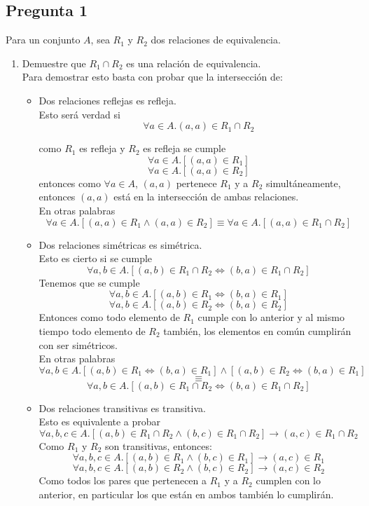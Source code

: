 \documentclass[letter]{article}
\begin{document}
	
	\begin{pregunta}{1} %
		\section*{Pregunta 1}
		Para un conjunto $A$, sea $R_1$ y $R_2$ dos relaciones de equivalencia.
		\begin{enumerate}
		\item Demuestre que $R_1 \cap R_2$ es una relación de equivalencia.\\
		
		Para demostrar esto basta con probar que la intersección de:
		\begin{itemize}
		\item Dos relaciones reflejas es refleja.\\
		
		Esto será verdad si 
		$$\forall a\in A. (a,a) \in R_1 \cap R_2$$
		
		como $R_1$ es refleja y $R_2$ es refleja se cumple 
		$$\forall a\in A. [(a,a) \in R_1]$$
		$$\forall a\in A. [(a,a) \in R_2]$$
		entonces como $\forall a\in A$, $(a,a)$ pertenece	$R_1$ y a $R_2$ simultáneamente, entonces $(a,a)$ está en la intersección de ambas relaciones.\\
		En otras palabras 
		$$\forall a \in A. [(a,a)\in R_1 \wedge (a,a)\in R_2]\equiv \forall a\in A.[(a,a)\in R_1\cap R_2]$$
		\item Dos relaciones simétricas es simétrica.\\
		
		Esto es cierto si se cumple
		$$\forall a,b  \in A. [(a,b)\in R_1\cap R_2 \Leftrightarrow (b,a)\in R_1\cap R_2] $$
		Tenemos que se cumple 
		$$\forall a,b  \in A. [(a,b)\in R_1 \Leftrightarrow (b,a)\in R_1] $$
		$$\forall a,b  \in A. [(a,b)\in R_2 \Leftrightarrow (b,a)\in R_2] $$
		Entonces como todo elemento de $R_1$ cumple con lo anterior y al mismo tiempo todo elemento de $R_2$ también, los elementos en común cumplirán con ser simétricos.\\
		En otras palabras
		$$\forall a,b  \in A. [(a,b)\in R_1 \Leftrightarrow (b,a)\in R_1]\wedge [(a,b)\in R_2 \Leftrightarrow (b,a)\in R_1]$$$$\equiv$$ $$\forall a,b \in A. [(a,b)\in R_1 \cap R_2\Leftrightarrow (b,a)\in R_1\cap R_2]$$
		\item Dos relaciones transitivas es transitiva.\\
		
		Esto es equivalente a probar
		$$\forall a,b,c\in A. [(a,b)\in R_1\cap R_2 \wedge (b,c)\in R_1\cap R_2] \rightarrow (a,c)\in R_1\cap R_2$$
		Como $R_1$ y $R_2$ son transitivas, entonces:
		$$\forall a,b,c\in A. [(a,b)\in R_1\wedge (b,c)\in R_1] \rightarrow (a,c)\in R_1$$
		$$\forall a,b,c\in A. [(a,b)\in R_2 \wedge (b,c)\in R_2] \rightarrow (a,c)\in R_2$$
		Como todos los pares que pertenecen a $R_1$ y a $R_2$ cumplen con lo anterior, en particular los que están en ambos también lo cumplirán.\\
		

\end{itemize}
\end{enumerate}
\end{pregunta}
\end{document}
